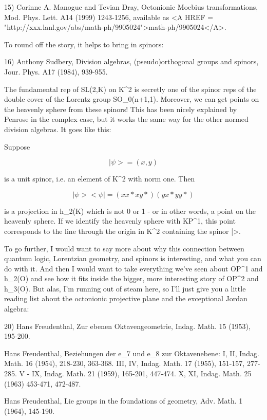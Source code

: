 15) Corinne A. Manogue and Tevian Dray, Octonionic Moebius transformations,
Mod. Phys. Lett. A14 (1999) 1243-1256, available as <A HREF = "http://xxx.lanl.gov/abs/math-ph/9905024">math-ph/9905024</A>.  

To round off the story, it helps to bring in spinors:

16) Anthony Sudbery, Division algebras, (pseudo)orthogonal groups and
spinors, Jour. Phys. A17 (1984), 939-955.  

The fundamental rep of SL(2,K) on K^{2} is secretly one of the
spinor reps of the double cover of the Lorentz group
SO_{0}(n+1,1).  Moreover, we can get points on the heavenly
sphere from these spinors!  This has been nicely explained by Penrose in
the complex case, but it works the same way for the other normed
division algebras.  It goes like this:

Suppose 

$$
|\psi > = (x,y) 

$$
    
is a unit spinor, i.e. an element of K^{2} with norm one.  Then

$$
|\psi > <\psi | =    ( xx*   xy* )
                 ( yx*   yy* )
$$
    

is a projection in h_{2}(K) which is not 0 or 1 - or in other
words, a point on the heavenly sphere.  If we identify the heavenly
sphere with KP^{1}, this point corresponds to the line through
the origin in K^{2} containing the spinor |\psi >.

To go further, I would want to say more about why this connection
between quantum logic, Lorentzian geometry, and spinors is interesting,
and what you can do with it.  And then I would want to take everything
we've seen about OP^{1} and h_{2}(O) and see how it fits
inside the bigger, more interesting story of OP^{2} and
h_{3}(O).  But alas, I'm running out of steam here, so I'll just
give you a little reading list about the octonionic projective plane and
the exceptional Jordan algebra:

20) Hans Freudenthal, Zur ebenen Oktavengeometrie, Indag. Math. 15
(1953), 195-200.  
  
Hans Freudenthal, Beziehungen der e_{7} und e_{8} 
zur Oktavenebene:
I, II, Indag. Math. 16 (1954), 218-230, 363-368.  
III, IV, Indag. Math. 17 (1955), 151-157, 277-285.  
V - IX, Indag. Math. 21 (1959), 165-201, 447-474.  
X, XI, Indag. Math. 25 (1963) 453-471, 472-487.  
  
Hans Freudenthal, Lie groups in the foundations of geometry, Adv.
Math. 1 (1964), 145-190.  
  
